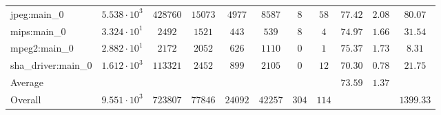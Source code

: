 \begin{tabular}{|l|c|c|c|c|c|c|c|c|c|c|}
jpeg:main\_0            & $ 5.538 \cdot 10^{3} $ & $ 428760 $ & $ 15073 $ & $ 4977  $ & $ 8587  $ & $ 8   $ & $ 58  $ & $ 77.42       $ & $ 2.08    $ & $ 80.07   $ \\
mips:main\_0            & $ 3.324 \cdot 10^{1} $ & $ 2492   $ & $ 1521  $ & $ 443   $ & $ 539   $ & $ 8   $ & $ 4   $ & $ 74.97       $ & $ 1.66    $ & $ 31.54   $ \\
mpeg2:main\_0           & $ 2.882 \cdot 10^{1} $ & $ 2172   $ & $ 2052  $ & $ 626   $ & $ 1110  $ & $ 0   $ & $ 1   $ & $ 75.37       $ & $ 1.73    $ & $ 8.31    $ \\
sha\_driver:main\_0     & $ 1.612 \cdot 10^{3} $ & $ 113321 $ & $ 2452  $ & $ 899   $ & $ 2105  $ & $ 0   $ & $ 12  $ & $ 70.30       $ & $ 0.78    $ & $ 21.75   $ \\
\hline
Average                 & $                    $ & $        $ & $       $ & $       $ & $       $ & $     $ & $     $ & $ 73.59       $ & $ 1.37    $ & $         $ \\
\hline
Overall                 & $ 9.551 \cdot 10^{3} $ & $ 723807 $ & $ 77846 $ & $ 24092 $ & $ 42257 $ & $ 304 $ & $ 114 $ & $             $ & $         $ & $ 1399.33 $ \\
\hline
\end{tabular}
